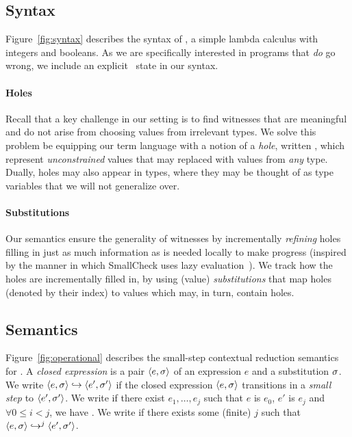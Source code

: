 \subsection{Syntax}
\label{sec:syntax}

%
Figure~\ref{fig:syntax} describes the syntax of \lang, a simple lambda
calculus with integers and booleans.
%
As we are specifically interested in programs that \emph{do} go wrong,
we include an explicit \stuck\ state in our syntax.

\paragraph{Holes}
\label{sec:holes}
%
Recall that a key challenge in our setting is to find witnesses
that are meaningful and do not arise from choosing values from
irrelevant types.
%
We solve this problem be equipping our term language with a notion
of a \emph{hole}, written \ehole{}, which represent \emph{unconstrained}
values that may replaced with values from \emph{any} type.
%
Dually, holes may also appear in types, where they may be thought
of as type variables that we will not generalize over.
%

\paragraph{Substitutions}
%
Our semantics ensure the generality of witnesses by incrementally
\emph{refining} holes filling in just as much information as is
needed locally to make progress (inspired by the manner in
which SmallCheck uses lazy evaluation~\cite{smallcheck}).
%
We track how the holes are incrementally filled in, by using
(value) \emph{substitutions} that map holes (denoted by their index)
to values which may, in turn, contain holes.
%


\subsection{Semantics}
\label{sec:semantics}

%
Figure~\ref{fig:operational} describes the small-step contextual
reduction semantics for \lang.
%
A \emph{closed expression} is a pair $\pair{e}{\vsu}$ of an expression $e$
and a substitution $\vsu$.
%
We write $\step{e}{\vsu}{e'}{\vsu'}$ if the closed expression $\pair{e}{\vsu}$
transitions in a \emph{small step} to $\pair{e'}{\vsu'}$.
%
We write  if there exist $e_1,\ldots,e_j$ such that
$e$ is $e_0$, $e'$ is $e_j$ and $\forall 0 \leq i < j$, we have
.
%
We write  if there exists some (finite) $j$ such that
$\stepi{j}{e}{\su}{e'}{\su'}$.



